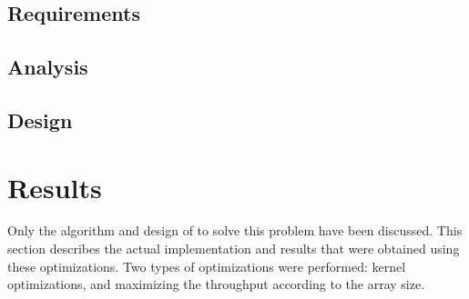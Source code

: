 \documentclass[10pt]{article}
\begin{document}
\begin{multicols}{2}
    \subsection{Requirements} %
    \subsection{Analysis} %
    \subsection{Design} %

\section{Results} %
Only the algorithm and design of to solve this problem have been discussed.
This section describes the actual implementation and results that were obtained using these optimizations.
Two types of optimizations were performed: kernel optimizations, and maximizing the throughput according to the array size.

\end{multicols}
\end{document}
